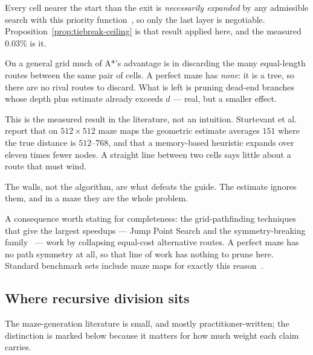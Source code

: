 \begin{description}[leftmargin=*,style=nextline,itemsep=6pt]
  \item[A tie-break cannot prune.] Every cell nearer the start than the exit is
    \emph{necessarily expanded} by any admissible search with this priority
    function~\cite{dechter1985generalized}, so only the last layer is
    negotiable. Proposition~\ref{prop:tiebreak-ceiling} is that result applied
    here, and the measured $0.03\%$ is it.
  \item[A* prunes subtrees, not rival routes.] On a general grid much of A*'s
    advantage is in discarding the many equal-length routes between the same
    pair of cells. A perfect maze has \emph{none}: it is a tree, so there are no
    rival routes to discard. What is left is pruning dead-end branches whose
    depth plus estimate already exceeds $d$ --- real, but a smaller effect.
  \item[The estimate is very inaccurate on mazes.] This is the measured result
    in the literature, not an intuition. Sturtevant et
    al.~\cite{sturtevant2009memory} report that on $512\times512$ maze maps the
    geometric estimate averages $151$ where the true distance is $512$--$768$,
    and that a memory-based heuristic expands over eleven times fewer nodes. A
    straight line between two cells says little about a route that must wind.
\end{description}

\begin{keypoint}
The walls, not the algorithm, are what defeats the guide. The estimate ignores
them, and in a maze they are the whole problem.
\end{keypoint}

A consequence worth stating for completeness: the grid-pathfinding techniques
that give the largest speedups --- Jump Point Search and the symmetry-breaking
family~\cite{harabor2011online} --- work by collapsing equal-cost alternative
routes. A perfect maze has no path symmetry at all, so that line of work has
nothing to prune here. Standard benchmark sets include maze maps for exactly
this reason~\cite{sturtevant2012benchmarks}.

\subsection{Where recursive division sits}

The maze-generation literature is small, and mostly practitioner-written; the
distinction is marked below because it matters for how much weight each claim
carries.

